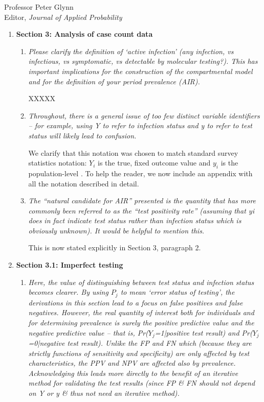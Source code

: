 \documentclass[11pt]{letter} %
\begin{document}
\begin{letter}{Professor
	Peter Glynn\\
	Editor, {\em Journal of Applied Probability}}
\begin{enumerate}
\begin{enumerate}
	\vspace{5mm}
\end{enumerate}
\item {\bf Section 3: Analysis of case count data}
\begin{enumerate}
	\item {\it Please clarify the definition of ‘active infection’ (any infection, vs infectious, vs symptomatic, vs detectable by molecular testing?). This has important implications for the construction of the compartmental model and for the definition of your period prevalence (AIR).}
	\vspace{5mm}

	XXXXX
	\vspace{5mm}
	\item {\it Throughout, there is a general issue of too few distinct variable identifiers – for example, using Y to refer to infection status and y to refer to test status will likely lead to confusion.}
	\vspace{5mm}

	We clarify that this notation was chosen to match standard survey statistics notation: $Y_i$ is the true, fixed outcome value and $y_i$ is the  population-level .  To help the reader, we now include an appendix with all the notation described in detail.
	\vspace{5mm}

	\item {\it The “natural candidate for AIR” presented is the quantity that has more commonly been referred to as the “test positivity rate” (assuming that yi does in fact indicate test status rather than infection status which is obviously unknown). It would be helpful to mention this.}
	\vspace{5mm}

	This is now stated explicitly in Section 3, paragraph 2.
\end{enumerate}
\item {\bf Section 3.1: Imperfect testing}
\begin{enumerate}
	\item {\it Here, the value of distinguishing between test status and infection status becomes clearer. By using $P_j$ to mean ‘error status of testing’, the derivations in this section lead to a focus on false positives and false negatives. However, the real quantity of interest both for individuals and for determining prevalence is surely the positive predictive value and the negative predictive value – that is, Pr($Y_j$=1|positive test result) and Pr($Y_j$=0|negative test result). Unlike the FP and FN which (because they are strictly functions of sensitivity and specificity) are only affected by test characteristics, the PPV and NPV are affected also by prevalence. Acknowledging this leads more directly to the benefit of an iterative method for validating the test results (since FP \& FN should not depend on Y or y \& thus not need an iterative method).}
	\vspace{5mm}


\end{enumerate}
\end{enumerate}
\end{letter}
\end{document}
